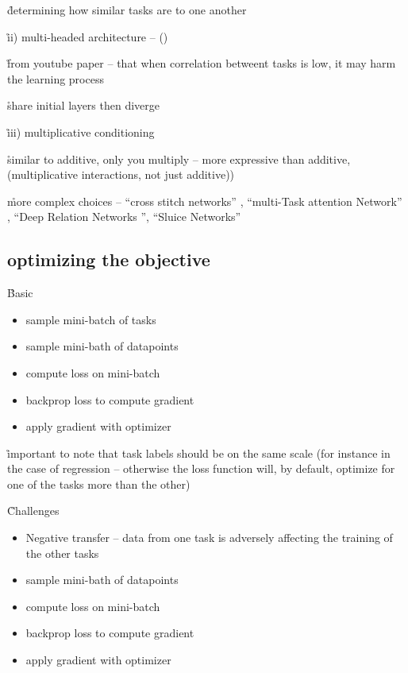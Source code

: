 \r{determining how similar tasks are to one another}

\r{ii) multi-headed architecture -- ()}

\r{from youtube paper -- that when correlation betweent tasks is low, it may harm the learning process}

\r{share initial layers then diverge}

\r{iii) multiplicative conditioning}

\r{similar to additive, only you multiply -- more expressive than additive, (multiplicative interactions, not just additive))}

\r{more complex choices -- ``cross stitch networks'' , ``multi-Task attention Network'' , ``Deep Relation Networks '', ``Sluice Networks'' }

\subsection{optimizing the objective}

\r{Basic}
\begin{itemize}[noitemsep,topsep=0pt]
	\item sample mini-batch of tasks
	\item sample mini-bath of datapoints
	\item compute loss on mini-batch
	\item backprop loss to compute gradient
	\item apply gradient with optimizer
\end{itemize}

\r{important to note that task labels should be on the same scale (for instance in the case of regression -- otherwise the loss function will, by default, optimize for one of the tasks more than the other)}

\r{Challenges}
\begin{itemize}[noitemsep,topsep=0pt]
	\item Negative transfer -- data from one task is adversely affecting the training of the other tasks
	\item sample mini-bath of datapoints
	\item compute loss on mini-batch
	\item backprop loss to compute gradient
	\item apply gradient with optimizer
\end{itemize}

